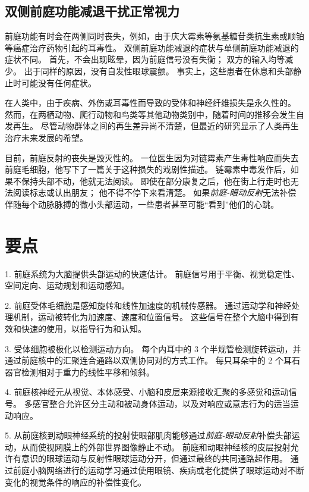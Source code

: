 \subsection{双侧前庭功能减退干扰正常视力}

前庭功能有时会在两侧同时丧失，例如，由于庆大霉素等氨基糖苷类抗生素或顺铂等癌症治疗药物引起的耳毒性。
双侧前庭功能减退的症状与单侧前庭功能减退的症状不同。
首先，不会出现眩晕，因为前庭信号没有失衡；
双方的输入均等减少。
出于同样的原因，没有自发性眼球震颤。
事实上，这些患者在休息和头部静止时可能没有任何症状。


在人类中，由于疾病、外伤或耳毒性而导致的受体和神经纤维损失是永久性的。
然而，在两栖动物、爬行动物和鸟类等其他动物类别中，随着时间的推移会发生自发再生。
尽管动物群体之间的再生差异尚不清楚，但最近的研究显示了人类再生治疗未来发展的希望。


目前，前庭反射的丧失是毁灭性的。
一位医生因为对链霉素产生毒性响应而失去前庭毛细胞，他写下了一篇关于这种损失的戏剧性描述。
链霉素中毒发作后，如果不保持头部不动，他就无法阅读。
即使在部分康复之后，他在街上行走时也无法阅读标志或认出朋友；
他不得不停下来看清楚。
如果\textit{前庭-眼动反射}无法补偿伴随每个动脉脉搏的微小头部运动，一些患者甚至可能“看到”他们的心跳。



\section{要点}

1. 前庭系统为大脑提供头部运动的快速估计。
前庭信号用于平衡、视觉稳定性、空间定向、运动规划和运动感知。


2. 前庭受体毛细胞是感知旋转和线性加速度的机械传感器。
通过运动学和神经处理机制，运动被转化为加速度、速度和位置信号。
这些信号在整个大脑中得到有效和快速的使用，以指导行为和认知。


3. 受体细胞被极化以检测运动方向。
每个内耳中的 3 个半规管检测旋转运动，并通过前庭核中的汇聚连合通路以双侧协同对的方式工作。
每只耳朵中的 2 个耳石器官检测相对于重力的线性平移和倾斜。


4. 前庭核神经元从视觉、本体感受、小脑和皮层来源接收汇聚的多感觉和运动信号。
多感官整合允许区分主动和被动身体运动，以及对响应或意志行为的适当运动响应。


5. 从前庭核到动眼神经系统的投射使眼部肌肉能够通过\textit{前庭-眼动反射}补偿头部运动，从而使视网膜上的外部世界图像静止不动。
前庭和动眼神经核的皮层投射允许有意识的眼球运动与反射性眼球运动分开，但通过最终的共同通路起作用。
通过前庭小脑网络进行的运动学习通过使用眼镜、疾病或老化提供了眼球运动对不断变化的视觉条件的响应的补偿性变化。


